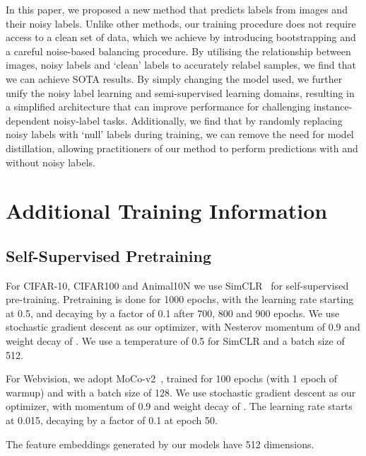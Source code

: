 \documentclass[10pt,twocolumn,letterpaper]{article}
\begin{document}
In this paper, we proposed a new method that predicts labels from images and their noisy labels. Unlike other methods, our training procedure does not require access to a clean set of data, which we achieve by introducing bootstrapping and a careful noise-based balancing procedure. By utilising the relationship between images, noisy labels and `clean' labels to accurately relabel samples, we find that we can achieve SOTA results. By simply changing the model used, we further unify the noisy label learning and semi-supervised learning domains, resulting in a simplified architecture that can improve performance for challenging instance-dependent noisy-label tasks. Additionally, we find that by randomly replacing noisy labels with `null' labels during training, we can remove the need for model distillation, allowing practitioners of our method to perform predictions with and without noisy labels. 

\clearpage

{\small


}

\clearpage

\appendix

\section{Additional Training Information}

\subsection{Self-Supervised Pretraining}

For CIFAR-10, CIFAR100 and Animal10N we use SimCLR~\cite{chen2020simple} for self-supervised pre-training. Pretraining is done for 1000 epochs, with the learning rate starting at 0.5, and decaying by a factor of 0.1 after 700, 800 and 900 epochs. We use stochastic gradient descent as our optimizer, with Nesterov momentum of 0.9 and weight decay of . We use a temperature of 0.5 for SimCLR and a batch size of 512.

For Webvision, we adopt MoCo-v2~\cite{chen2020improved}, trained for 100 epochs (with 1 epoch of warmup) and with a batch size of 128. We use stochastic gradient descent as our optimizer, with momentum of 0.9 and weight decay of . The learning rate starts at 0.015, decaying by a factor of 0.1 at epoch 50.

The feature embeddings generated by our models have 512 dimensions.
\end{document}
